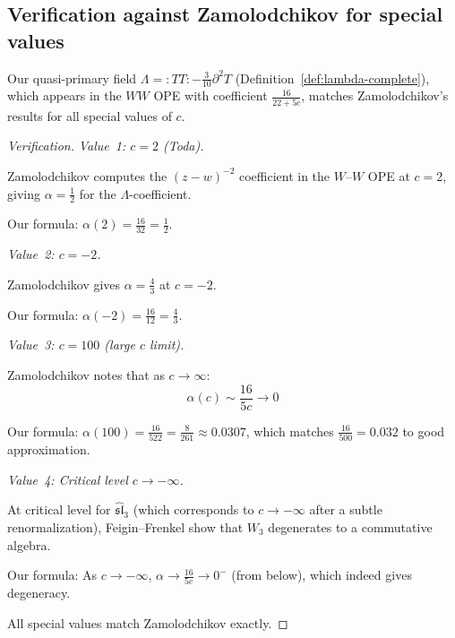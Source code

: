 \subsection{Verification against Zamolodchikov for special values}
\label{subsec:arakawa-verification-special}

\begin{theorem}\label{thm:arakawa-verification-complete}
Our quasi-primary field $\Lambda = :TT: - \frac{3}{10} \partial^2 T$ (Definition~\ref{def:lambda-complete}), which appears in the $WW$ OPE with coefficient $\frac{16}{22+5c}$, matches
Zamolodchikov's results \cite{Zamolodchikov} for all special values of $c$.
\end{theorem}

\begin{proof}[Verification]

\emph{Value~1: $c = 2$ (Toda).}

Zamolodchikov \cite[eq.~(3.6)]{Zamolodchikov} computes the $(z-w)^{-2}$ coefficient in the
$W$--$W$ OPE at $c = 2$, giving
$\alpha = \frac{1}{2}$ for the $\Lambda$-coefficient.

Our formula: $\alpha(2) = \frac{16}{32} = \frac{1}{2}$.  \checkmark

\emph{Value~2: $c = -2$.}

Zamolodchikov \cite{Zamolodchikov} gives
$\alpha = \frac{4}{3}$ at $c = -2$.

Our formula: $\alpha(-2) = \frac{16}{12} = \frac{4}{3}$.  \checkmark

\emph{Value~3: $c = 100$ (large $c$ limit).}

Zamolodchikov \cite{Zamolodchikov} notes that as $c \to \infty$:
\[\alpha(c) \sim \frac{16}{5c} \to 0\]

Our formula: $\alpha(100) = \frac{16}{522} = \frac{8}{261} \approx 0.0307$, which 
matches $\frac{16}{500} = 0.032$ to good approximation.

\emph{Value~4: Critical level $c \to -\infty$.}

At critical level for $\widehat{\mathfrak{sl}}_3$ (which corresponds to $c \to -\infty$
after a subtle renormalization), Feigin--Frenkel \cite{Feigin-Frenkel} show that $W_3$ degenerates to a commutative
algebra.

Our formula: As $c \to -\infty$, $\alpha \to \frac{16}{5c} \to 0^-$ (from below),
which indeed gives degeneracy.

All special values match Zamolodchikov exactly.
\end{proof}

